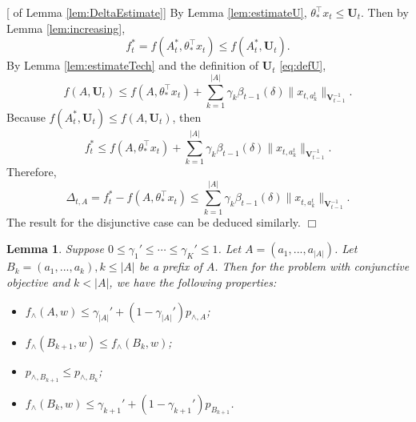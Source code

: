 \documentclass{article}
\newcommand{\bU}{\mathbf{U}}
\newcommand{\bV}{\mathbf{V}}
\newcommand{\abs}[1]{\left| #1 \right|}
\newcommand{\norm}[1]{\| #1 \|}
\newtheorem{lemma}[theorem]{Lemma}%
\newenvironment{proof}{\noindent {\textbf{Proof. }}}{$\Box$ \medskip}
\begin{document}
\begin{proof}[ of Lemma \ref{lem:DeltaEstimate}]
By Lemma \ref{lem:estimateU}, $\theta_{\ast}^{\top}x_t \leq \bU_t$. Then by Lemma \ref{lem:increasing},
$$
f_t^{\ast} = f(A_t^{\ast}, \theta_{\ast}^{\top}x_t) \leq f(A_t^{\ast}, \bU_t).
$$
By Lemma \ref{lem:estimateTech} and the definition of $\bU_t$ \eqref{eq:defU},
$$
f(A, \bU_t) \leq f(A, \theta_{\ast}^{\top}x_t) + \sum_{k=1}^{\abs{A}} \gamma_k \beta_{t-1}(\delta)\norm{x_{t, a_k^t}}_{\bV_{t-1}^{-1}}.
$$
Because $f(A_t^{\ast}, \bU_t) \leq f(A, \bU_t)$, then 
$$
f_t^{\ast} \leq f(A, \theta_{\ast}^{\top}x_t) + \sum_{k=1}^{\abs{A}} \gamma_k \beta_{t-1}(\delta)\norm{x_{t, a_k^t}}_{\bV_{t-1}^{-1}}.
$$
Therefore,
$$
\Delta_{t, A} = f_t^{\ast} - f(A, \theta_{\ast}^{\top}x_t) \leq \sum_{k=1}^{\abs{A}} \gamma_k \beta_{t-1}(\delta)\norm{x_{t, a_k^t}}_{\bV_{t-1}^{-1}}.
$$
The result for the disjunctive case can be deduced similarly.
\end{proof}

\begin{lemma}
\label{lem:prefixRelation}
Suppose 
$0 \leq \gamma_1' \leq \cdots \leq \gamma_K' \leq 1$. Let $A = (a_1, ..., a_{\abs{A}})$. 
Let $B_k = (a_1, ..., a_k), k \leq \abs{A}$ be a prefix of $A$. Then for the problem with conjunctive objective and $k < \abs{A}$, we have the following properties:
\begin{itemize}
\item[(1)] $f_{\wedge}(A, w) \leq \gamma_{\abs{A}}' + (1 - \gamma_{\abs{A}}') p_{\wedge, A}$;
\item[(2)] $f_{\wedge}(B_{k+1}, w) \leq f_{\wedge}(B_k, w)$;
\item[(3)] $p_{\wedge, B_{k+1}} \leq p_{\wedge, B_k}$;
\item[(4)] $f_{\wedge}(B_k, w) \leq \gamma_{k+1}' + (1 - \gamma_{k+1}') p_{B_{k+1}}$.
\end{itemize}
\end{lemma}
\end{document}
